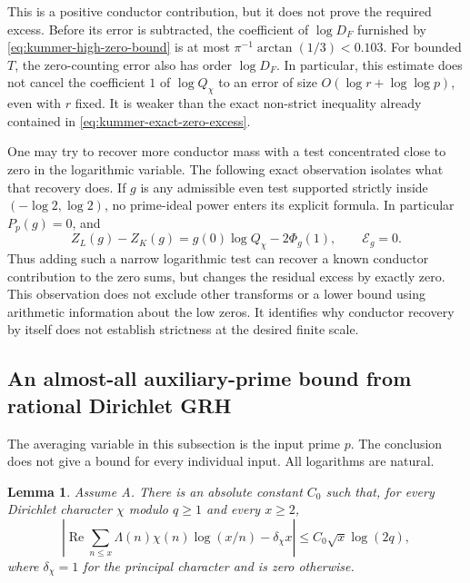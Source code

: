 \documentclass[11pt]{article}
\newtheorem{lemma}[theorem]{Lemma}
\theoremstyle{definition}
\theoremstyle{remark}
\begin{document}
This is a positive conductor contribution, but it does not
prove the required excess.  Before its error is subtracted,
the coefficient of $\log D_F$ furnished by
\eqref{eq:kummer-high-zero-bound} is at most
$\pi^{-1}\arctan(1/3)<0.103$.
For bounded $T$, the zero-counting error also has order
$\log D_F$.  In particular, this estimate does not cancel
the coefficient $1$ of $\log Q_\chi$ to an error of size
$O(\log r+\log\log p)$, even with $r$ fixed.
It is weaker than the exact non-strict inequality already
contained in \eqref{eq:kummer-exact-zero-excess}.

One may try to recover more conductor mass with a test
concentrated close to zero in the logarithmic variable.
The following exact observation isolates what that recovery
does.  If $g$ is any admissible even test supported strictly
inside $(-\log2,\log2)$, no prime-ideal power enters its
explicit formula.  In particular $P_p(g)=0$, and
\begin{equation}\label{eq:kummer-small-support-null}
 Z_L(g)-Z_K(g)=g(0)\log Q_\chi-2\Phi_g(1),
 \qquad \mathcal E_g=0.
\end{equation}
Thus adding such a narrow logarithmic test can recover a
known conductor contribution to the zero sums, but changes
the residual excess by exactly zero.  This observation does
not exclude other transforms or a lower bound using
arithmetic information about the low zeros.  It
identifies why conductor recovery by itself does not establish
strictness at the desired finite scale.

\subsection{An almost-all auxiliary-prime bound from rational Dirichlet GRH}

The averaging variable in this subsection is the input prime $p$.
The conclusion does not give a bound for every individual input.
All logarithms are natural.

\begin{lemma}\label{lem:dirichlet-log-weight}
Assume A.  There is an absolute constant $C_0$ such that, for every
Dirichlet character $\chi$ modulo $q\ge1$ and every $x\ge2$,
\[
 \left|\operatorname{Re}\sum_{n\le x}\Lambda(n)\chi(n)
                 \log(x/n)-\delta_\chi x\right|
 \le C_0\sqrt{x}\log(2q),
\]
where $\delta_\chi=1$ for the principal character and is zero otherwise.
\end{lemma}
\end{document}
